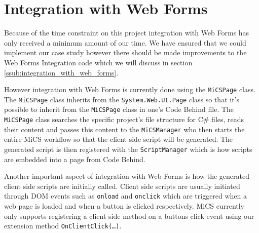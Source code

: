 \section{Integration with Web Forms} %
\label{sec:integration_with_web_forms}
	Because of the time constraint on this project integration with Web Forms has only received a minimum amount of our time. We have ensured that we could implement our case study however there should be made improvements to the Web Forms Integration code which we will discuss in section \ref{ssub:integration_with_web_forms}.

	However integration with Web Forms is currently done using the \texttt{MiCSPage} class. The \texttt{MiCSPage} class inherits from the \texttt{System.Web.UI.Page} class so that it’s possible to inherit from the \texttt{MiCSPage} class in one's Code Behind file.  The \texttt{MiCSPage} class searches the specific project's file structure for C\# files, reads their content and passes this content to the \texttt{MiCSManager} who then starts the entire MiCS workflow so that the client side script will be generated. The generated script is then registered with the \texttt{ScriptManager} which is how scripts are embedded into a page from Code Behind.

	Another important aspect of integration with Web Forms is how the generated client side scripts are initially called. Client side scripts are usually initiated through DOM events such as \texttt{onload} and \texttt{onclick} which are triggered when a web page is loaded and when a button is clicked respectively. MiCS currently only supports registering a client side method on a buttons click event using our extension method \texttt{OnClientClick(…)}.

